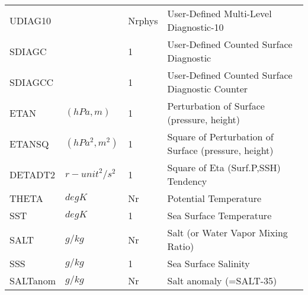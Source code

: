 \begin{tabular}{llll}
 UDIAG10  &             &    Nrphys  
         &\begin{minipage}[t]{3in}
          {User-Defined Multi-Level Diagnostic-10} 
         \end{minipage}\\
 SDIAGC   &             &    1  
         &\begin{minipage}[t]{3in}
          {User-Defined Counted Surface Diagnostic} 
         \end{minipage}\\
 SDIAGCC  &             &    1  
         &\begin{minipage}[t]{3in}
          {User-Defined Counted Surface Diagnostic Counter} 
         \end{minipage}\\
 ETAN     & $(hPa,m)$ &    1
         &\begin{minipage}[t]{3in}
          {Perturbation of Surface (pressure, height)} 
         \end{minipage}\\
 ETANSQ   & $(hPa^2,m^2)$ & 1
         &\begin{minipage}[t]{3in}
          {Square of Perturbation of Surface (pressure, height)} 
         \end{minipage}\\
 DETADT2  & ${r-unit}^2/s^2$ & 1
         &\begin{minipage}[t]{3in}
          {Square of Eta (Surf.P,SSH) Tendency} 
         \end{minipage}\\
 THETA    & $deg K$ & Nr
         &\begin{minipage}[t]{3in}
          {Potential Temperature} 
         \end{minipage}\\
 SST      & $deg K$ & 1
         &\begin{minipage}[t]{3in}
          {Sea Surface Temperature} 
         \end{minipage}\\
 SALT     & $g/kg$ & Nr
         &\begin{minipage}[t]{3in}
          {Salt (or Water Vapor Mixing Ratio)} 
         \end{minipage}\\
 SSS      & $g/kg$ & 1
         &\begin{minipage}[t]{3in}
          {Sea Surface Salinity} 
         \end{minipage}\\
 SALTanom & $g/kg$ & Nr
         &\begin{minipage}[t]{3in}
          {Salt anomaly (=SALT-35)} 
         \end{minipage}\\
\end{tabular}
\vspace{1.5in}
\vfill

